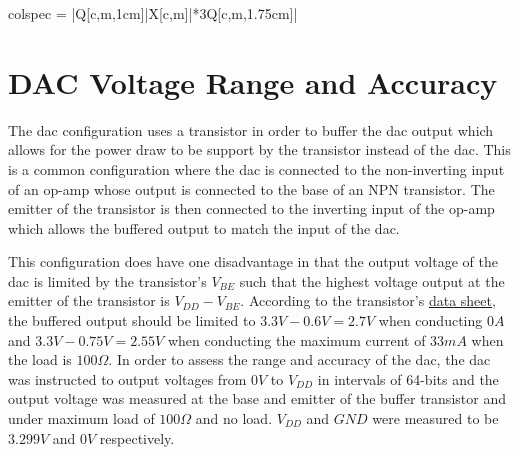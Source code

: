 \begin{longtblr}[
        caption = {A summary of the evaluation and testing of the salinometer.},
        label = {tab:testing-summary}
    ]{
        colspec = {|Q[c,m,1cm]|X[c,m]|*{3}{Q[c,m,1.75cm]|}}
    }
\end{longtblr}

\section{DAC Voltage Range and Accuracy}\label{sec:dac-voltage-range-and-accuracy}

The \gls{dac} configuration uses a transistor in order to buffer the \gls{dac} output which allows for the power draw to be support by the transistor instead of the \gls{dac}.
This is a common configuration where the \gls{dac} is connected to the non-inverting input of an op-amp whose output is connected to the base of an NPN transistor.
The emitter of the transistor is then connected to the inverting input of the op-amp which allows the buffered output to match the input of the \gls{dac}.

This configuration does have one disadvantage in that the output voltage of the \gls{dac} is limited by the transistor's $V_{BE}$ such that the highest voltage output at the emitter of the transistor is $V_{DD} - V_{BE}$.
According to the transistor's \href{https://www.lcsc.com/datasheet/lcsc_datasheet_2310131500_Jiangsu-Changjing-Electronics-Technology-Co---Ltd--S8050-J3Y-RANGE-200-350_C2146.pdf}{data sheet}, the buffered output should be limited to $3.3V - 0.6V = 2.7V$ when conducting $0A$ and $3.3V - 0.75V = 2.55V$ when conducting the maximum current of $33mA$ when the load is $100\Omega$.
In order to assess the range and accuracy of the \gls{dac}, the \gls{dac} was instructed to output voltages from $0V$ to $V_{DD}$ in intervals of 64-bits and the output voltage was measured at the base and emitter of the buffer transistor and under maximum load of $100\Omega$ and no load.
$V_{DD}$ and $GND$ were measured to be $3.299V$ and $0V$ respectively.

